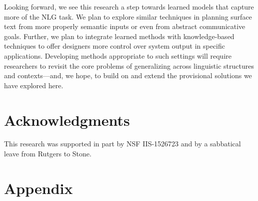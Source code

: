 \documentclass[11pt]{article}
\begin{document}
Looking forward, we see this research a step towards learned
models that capture more of the NLG task.
%
We plan to explore similar techniques in planning surface text from
more properly semantic inputs or even from abstract communicative
goals.
%
Further, we plan to integrate learned methods with knowledge-based
techniques to offer designers more control over system output in
specific applications.
%
Developing methods appropriate to such settings will require
researchers to revisit the core problems of generalizing
across linguistic structures and contexts---and, we hope, to build on
and extend the provisional solutions we have explored here.

\section*{Acknowledgments}

This research was supported in part by NSF IIS-1526723 and by a
sabbatical leave from Rutgers to Stone.


\appendix

\section{Appendix}
\label{sec:appendix}
\end{document}
